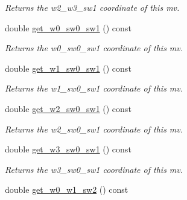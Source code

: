 \begin{DoxyCompactItemize}
\begin{DoxyCompactList}\small\item\em Returns the w2\-\_\-w3\-\_\-sw1 coordinate of this mv. \end{DoxyCompactList}\item 
\hypertarget{classe3ga_1_1mv_a264baf155829f165c7a60347b777f437}{double \hyperlink{classe3ga_1_1mv_a264baf155829f165c7a60347b777f437}{get\-\_\-w0\-\_\-sw0\-\_\-sw1} () const }\label{classe3ga_1_1mv_a264baf155829f165c7a60347b777f437}

\begin{DoxyCompactList}\small\item\em Returns the w0\-\_\-sw0\-\_\-sw1 coordinate of this mv. \end{DoxyCompactList}\item 
\hypertarget{classe3ga_1_1mv_a175c96ca0c0357c93264456fbd304d6a}{double \hyperlink{classe3ga_1_1mv_a175c96ca0c0357c93264456fbd304d6a}{get\-\_\-w1\-\_\-sw0\-\_\-sw1} () const }\label{classe3ga_1_1mv_a175c96ca0c0357c93264456fbd304d6a}

\begin{DoxyCompactList}\small\item\em Returns the w1\-\_\-sw0\-\_\-sw1 coordinate of this mv. \end{DoxyCompactList}\item 
\hypertarget{classe3ga_1_1mv_af1643df4c131c6fa1b1fffd4d1033b48}{double \hyperlink{classe3ga_1_1mv_af1643df4c131c6fa1b1fffd4d1033b48}{get\-\_\-w2\-\_\-sw0\-\_\-sw1} () const }\label{classe3ga_1_1mv_af1643df4c131c6fa1b1fffd4d1033b48}

\begin{DoxyCompactList}\small\item\em Returns the w2\-\_\-sw0\-\_\-sw1 coordinate of this mv. \end{DoxyCompactList}\item 
\hypertarget{classe3ga_1_1mv_a734d3be1d46f9662da3e66c5e633b17e}{double \hyperlink{classe3ga_1_1mv_a734d3be1d46f9662da3e66c5e633b17e}{get\-\_\-w3\-\_\-sw0\-\_\-sw1} () const }\label{classe3ga_1_1mv_a734d3be1d46f9662da3e66c5e633b17e}

\begin{DoxyCompactList}\small\item\em Returns the w3\-\_\-sw0\-\_\-sw1 coordinate of this mv. \end{DoxyCompactList}\item 
\hypertarget{classe3ga_1_1mv_a906775b80b41f2b00b9b9a8f203a8687}{double \hyperlink{classe3ga_1_1mv_a906775b80b41f2b00b9b9a8f203a8687}{get\-\_\-w0\-\_\-w1\-\_\-sw2} () const }\label{classe3ga_1_1mv_a906775b80b41f2b00b9b9a8f203a8687}


\end{DoxyCompactItemize}
